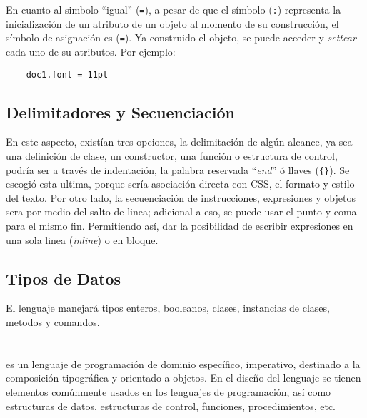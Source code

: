 \documentclass[12pt,letterpaper,titlepage,oneside,openright]{book}
\newcommand{\OhTeX}{%
    \makebox[0.76em][c]{O}%
    \makebox[0.25em][c]{%
        \raisebox{0.14em}[0em][0em]{%
            \fontsize{0.5em}{0cm}%
                \selectfont H%
        }%
    }%
    \makebox[1.35em][c]{\TeX}%
}
\newcommand{\ohtex}{\OhTeX\xspace}
\newcommand{\ttcode}[1]{(\texttt{#1})}
\begin{document}
En cuanto al simbolo ``igual'' (\texttt{=}), a pesar de que el símbolo (\texttt{:}) representa la inicialización de un
atributo de un objeto al momento de su construcción, el símbolo de asignación es
(\texttt{=}). Ya construido el objeto, se puede acceder y \textit{settear} cada
uno de su atributos. Por ejemplo:

\begin{center}
\begin{lstlisting}
    doc1.font = 11pt
\end{lstlisting}
\end{center}

\section{Delimitadores y Secuenciación}

En este aspecto, existían tres opciones, la delimitación de algún alcance, ya
sea una definición de clase, un constructor, una función o estructura de control,
podría ser a través de indentación, la palabra reservada ``\textit{end}'' ó llaves
\ttcode{\{\}}. Se escogió esta ultima, porque sería asociación directa con CSS,
el formato y estilo del texto. Por otro lado, la secuenciación de instrucciones,
expresiones y objetos sera por medio del salto de linea; adicional a eso, se puede
usar el punto-y-coma para el mismo fin. Permitiendo así, dar la posibilidad de
escribir expresiones en una sola linea (\textit{inline}) o en bloque.

\section{Tipos de Datos}

El lenguaje manejará tipos enteros, booleanos, clases, instancias de clases, metodos y comandos.

%

\chapter[OhTeX]{\ohtex}

\ohtex es un lenguaje de programación de dominio específico, imperativo,
destinado a la composición tipográfica y orientado a objetos. En el diseño del
lenguaje se tienen elementos comúnmente usados en los lenguajes de programación,
así como estructuras de datos, estructuras de control, funciones,
procedimientos, etc.
\end{document}
